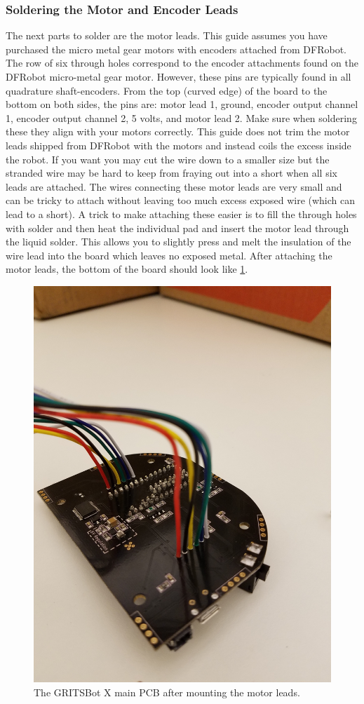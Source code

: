 \subsubsection{Soldering the Motor and Encoder Leads}
\label{sec:solderMotorJumper}

The next parts to solder are the motor leads. This guide assumes you have purchased the micro metal gear motors with encoders attached from DFRobot. The row of six through holes correspond to the encoder attachments found on the DFRobot micro-metal gear motor. However, these pins are typically found in all quadrature shaft-encoders. From the top (curved edge) of the board to the bottom on both sides, the pins are: motor lead 1, ground, encoder output channel 1, encoder output channel 2, 5 volts, and motor lead 2. Make sure when soldering these they align with your motors correctly. This guide does not trim the motor leads shipped from DFRobot with the motors and instead coils the excess inside the robot. If you want you may cut the wire down to a smaller size but the stranded wire may be hard to keep from fraying out into a short when all six leads are attached. The wires connecting these motor leads are very small and can be tricky to attach without leaving too much excess exposed wire (which can lead to a short). A trick to make attaching these easier is to fill the through holes with solder and then heat the individual pad and insert the motor lead through the liquid solder. This allows you to slightly press and melt the insulation of the wire lead into the board which leaves no exposed metal. After attaching the motor leads, the bottom of the board should look like \cref{fig:finishedPCB}.

\begin{figure}[h!]
\centering
\includegraphics[width=0.65\columnwidth, keepaspectratio]{./figs/20180912_115521.jpg}
\caption{The GRITSBot X main PCB after mounting the motor leads.}
\label{fig:finishedPCB}
\end{figure}

